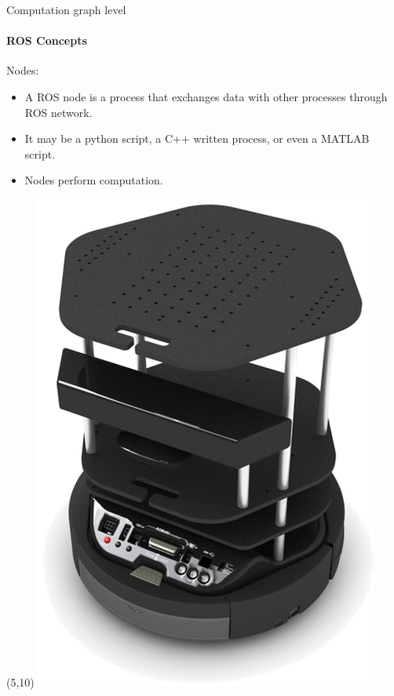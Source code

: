 \documentclass{beamer}
\begin{document}
\begin{frame}{Computation graph level}
    \framesubtitle{ROS Concepts}
    {\huge Nodes:}
    \vspace{1cm}
    \begin{itemize}
        \item A ROS node is a process that exchanges data with other processes through ROS network.
        
        \item It may be a python script, a C++ written process, or even a MATLAB script.
        
        \item Nodes perform computation.
    \end{itemize}
\end{frame}

 \begin{frame}[plain]{}
     \begin{textblock}{5}(5,10)
         \includegraphics[width=0.5\linewidth]{figures/platform.png}
     \end{textblock}
    \end{frame}
    
\end{document}
